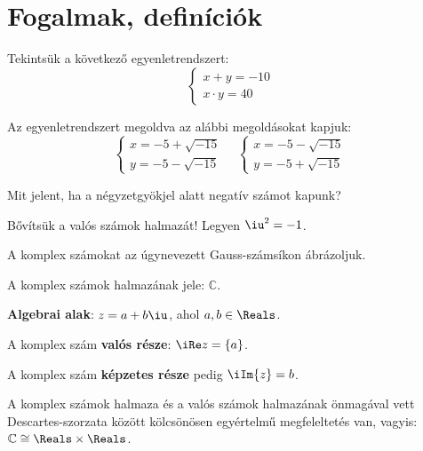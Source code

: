 \section{Fogalmak, definíciók}

\begin{blueBox}
  Tekintsük a következő egyenletrendszert:
  \[
    \begin{cases}
      x + y = -10 \\
      x \cdot y = 40
    \end{cases}
  \]

  Az egyenletrendszert megoldva az alábbi megoldásokat kapjuk:
  \[
    \begin{cases}
      x = -5 + \sqrt{-15} \\
      y = -5 - \sqrt{-15}
    \end{cases}
    \quad
    \begin{cases}
      x = -5 - \sqrt{-15} \\
      y = -5 + \sqrt{-15}
    \end{cases}
  \]

  Mit jelent, ha a négyzetgyökjel alatt negatív számot kapunk?

  Bővítsük a valós számok halmazát! Legyen $\iu^2 = -1$.

  A komplex számokat az úgynevezett Gauss-számsíkon ábrázoljuk.

  \begin{center}
  \end{center}

  A komplex számok halmazának jele: $\mathbb C$.

  \textbf{Algebrai alak}: $z = a + b\iu$, ahol $a, b \in \Reals$.

  A komplex szám \textbf{valós része}: $\iRe z = \{a\}$.

  A komplex szám \textbf{képzetes része} pedig $\iIm \{z\} = b$.
\end{blueBox}

\begin{note}
  A komplex számok halmaza és a valós számok halmazának önmagával vett
  Descartes-szorzata között kölcsönösen egyértelmű megfeleltetés van, vagyis:
  $\mathbb C \cong \Reals \times \Reals$.
\end{note}

